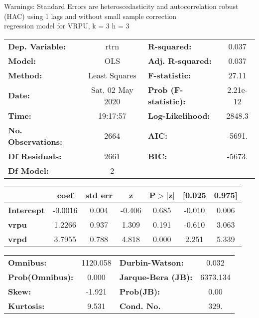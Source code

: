 Warnings: \newline
 [1] Standard Errors are heteroscedasticity and autocorrelation robust (HAC) using 1 lags and without small sample correction\\ 

regression model for VRPU, k = 3 h = 3\begin{center}
\begin{tabular}{lclc}
\toprule
\textbf{Dep. Variable:}    &       rtrn       & \textbf{  R-squared:         } &     0.037   \\
\textbf{Model:}            &       OLS        & \textbf{  Adj. R-squared:    } &     0.037   \\
\textbf{Method:}           &  Least Squares   & \textbf{  F-statistic:       } &     27.11   \\
\textbf{Date:}             & Sat, 02 May 2020 & \textbf{  Prob (F-statistic):} &  2.21e-12   \\
\textbf{Time:}             &     19:17:57     & \textbf{  Log-Likelihood:    } &    2848.3   \\
\textbf{No. Observations:} &        2664      & \textbf{  AIC:               } &    -5691.   \\
\textbf{Df Residuals:}     &        2661      & \textbf{  BIC:               } &    -5673.   \\
\textbf{Df Model:}         &           2      & \textbf{                     } &             \\
\bottomrule
\end{tabular}
\begin{tabular}{lcccccc}
                   & \textbf{coef} & \textbf{std err} & \textbf{z} & \textbf{P$> |$z$|$} & \textbf{[0.025} & \textbf{0.975]}  \\
\midrule
\textbf{Intercept} &      -0.0016  &        0.004     &    -0.406  &         0.685        &       -0.010    &        0.006     \\
\textbf{vrpu}      &       1.2266  &        0.937     &     1.309  &         0.191        &       -0.610    &        3.063     \\
\textbf{vrpd}      &       3.7955  &        0.788     &     4.818  &         0.000        &        2.251    &        5.339     \\
\bottomrule
\end{tabular}
\begin{tabular}{lclc}
\textbf{Omnibus:}       & 1120.058 & \textbf{  Durbin-Watson:     } &    0.032  \\
\textbf{Prob(Omnibus):} &   0.000  & \textbf{  Jarque-Bera (JB):  } & 6373.134  \\
\textbf{Skew:}          &  -1.921  & \textbf{  Prob(JB):          } &     0.00  \\
\textbf{Kurtosis:}      &   9.531  & \textbf{  Cond. No.          } &     329.  \\
\bottomrule
\end{tabular}
\end{center}

